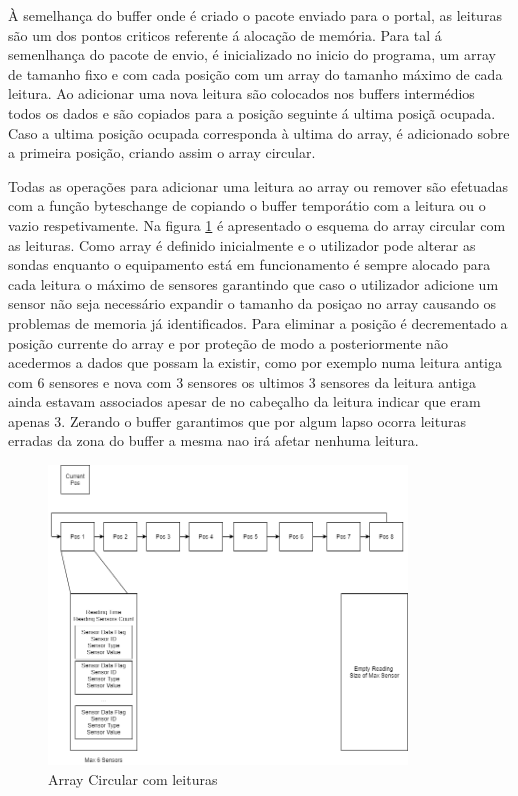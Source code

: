 \par À semelhança do buffer onde é criado o pacote enviado para o portal, as leituras são um dos pontos criticos referente á alocação de memória. Para tal á semenlhança do pacote de envio, é inicializado no inicio do programa, um array de tamanho fixo e com cada posição com um array do tamanho máximo de cada leitura. Ao adicionar uma nova leitura são colocados nos buffers intermédios todos os dados e são copiados para a posição seguinte á ultima posiçã ocupada. Caso a ultima posição ocupada corresponda à ultima do array, é adicionado sobre a primeira posição, criando assim o array circular.
\par Todas as operações para adicionar uma leitura ao array ou remover são efetuadas com a função byteschange de  copiando o buffer temporátio com a leitura ou o vazio respetivamente. Na figura \ref{circbuf} é apresentado o esquema do array circular com as leituras. Como array é definido inicialmente e o utilizador pode alterar as sondas enquanto o equipamento está em funcionamento é sempre alocado para cada leitura o máximo de sensores garantindo que caso o utilizador adicione um sensor não seja necessário expandir o tamanho da posiçao no array causando os problemas de memoria já identificados. Para eliminar a posição é decrementado a posição currente do array e por proteção de modo a posteriormente não acedermos a dados que possam la existir, como por exemplo numa leitura antiga com 6 sensores e nova com 3 sensores os ultimos 3 sensores da leitura antiga ainda estavam associados apesar de no cabeçalho da leitura indicar que eram apenas 3. Zerando o buffer garantimos que por algum lapso ocorra leituras erradas da zona do buffer a mesma nao irá afetar nenhuma leitura.


 \begin{figure}[ht]
\centering
\includegraphics[width=0.85\textwidth]{images/circbuf.png}
\caption{Array Circular com leituras}\label{circbuf}
\end{figure}


